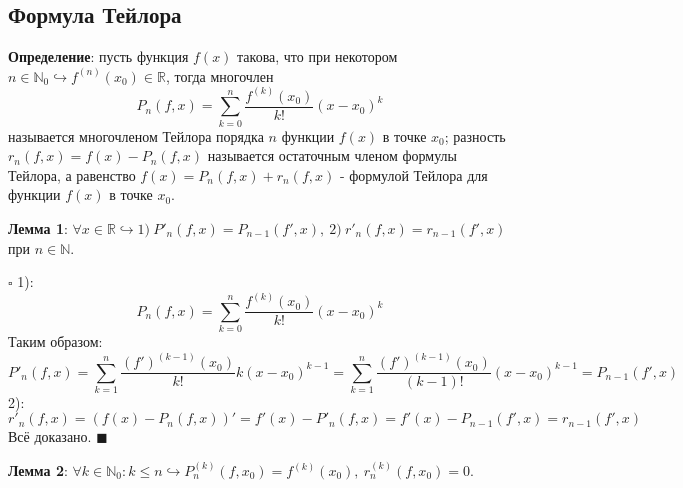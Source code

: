 \documentclass[12pt, a4paper, reqno]{article}
\begin{document}
\subsection{Формула Тейлора}

    \textbf{Определение}: пусть функция $f(x)$ такова, что при некотором $n\in\mathbb{N}_0
    \hookrightarrow f^{(n)}(x_0)\in\mathbb{R}$, тогда многочлен
    \begin{equation*}
        P_n(f, x) = \sum\limits_{k = 0}^{n}\dfrac{f^{(k)}(x_0)}{k!}(x - x_0)^k
    \end{equation*}
    называется многочленом Тейлора порядка $n$ функции $f(x)$ в точке $x_0$; разность $r_n(f, x) =
    f(x) - P_n(f, x)$ называется остаточным членом формулы Тейлора, а равенство
    $f(x) = P_n(f, x) + r_n(f, x)$ - формулой Тейлора для функции $f(x)$ в точке $x_0$.

    \textbf{Лемма 1}: $\forall x\in\mathbb{R}\hookrightarrow 1)\ P'_n(f, x) = P_{n - 1}(f', x),\
    2)\ r'_n(f, x) = r_{n - 1}(f', x)$ при $n\in\mathbb{N}$.

    $\square$ 1):
    \begin{equation*}
        P_n(f, x) = \sum\limits_{k = 0}^{n}\dfrac{f^{(k)}(x_0)}{k!}(x - x_0)^k
    \end{equation*}
    Таким образом:
    \begin{equation*}
        P'_n(f, x) = \sum\limits_{k = 1}^{n}\dfrac{(f')^{(k - 1)}(x_0)}{k!}k(x - x_0)^{k - 1} =
        \sum\limits_{k = 1}^{n}\dfrac{(f')^{(k - 1)}(x_0)}{(k - 1)!}(x - x_0)^{k - 1} =
        P_{n - 1}(f', x)
    \end{equation*}
    2):
    \begin{equation*}
        r'_n(f, x) = (f(x) - P_n(f, x))' = f'(x) - P'_n(f, x) =
        f'(x) - P_{n-1}(f', x) = r_{n - 1}(f', x)
    \end{equation*}
    Всё доказано. $\blacksquare$

    \textbf{Лемма 2}: $\forall k\in\mathbb{N}_0: k \leq n\hookrightarrow P_{n}^{(k)}(f, x_0) =
    f^{(k)}(x_0),\ r_{n}^{(k)}(f, x_0) = 0$.
\end{document}
